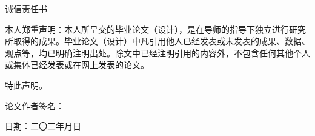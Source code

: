 \begin{center}
\heiti{}诚信责任书
\end{center}
\vspace{1cm}

\fangsong{}本人郑重声明：本人所呈交的毕业论文（设计），是在导师的指导下独立进行研究所取得的成果。毕业论文（设计）中凡引用他人已经发表或未发表的成果、数据、观点等，均已明确注明出处。除文中已经注明引用的内容外，不包含任何其他个人或集体已经发表或在网上发表的论文。

特此声明。
\vspace{9cm}


\begin{flushleft}
论文作者签名：\qquad\qquad\qquad\vspace{0.25cm}
\end{flushleft}
\begin{flushright}
日期：二〇二\quad 年\quad 月\quad 日\quad\qquad
\end{flushright}

